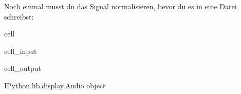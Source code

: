 \documentclass[letterpaper,10pt,english]{jupyterBook}
\begin{document}
\sphinxAtStartPar
Noch einmal musst du das Signal normalisieren, bevor du es in eine Datei schreibst:

\begin{sphinxuseclass}{cell}\begin{sphinxVerbatimInput}

\begin{sphinxuseclass}{cell_input}
\begin{sphinxVerbatim}[commandchars=\\\{\}]
   
      
  
 
\end{sphinxVerbatim}

\end{sphinxuseclass}\end{sphinxVerbatimInput}
\begin{sphinxVerbatimOutput}

\begin{sphinxuseclass}{cell_output}
\begin{sphinxVerbatim}[commandchars=\\\{\}]
\PYGZlt{}IPython.lib.display.Audio object\PYGZgt{}
\end{sphinxVerbatim}

\end{sphinxuseclass}\end{sphinxVerbatimOutput}

\end{sphinxuseclass}
\end{document}
